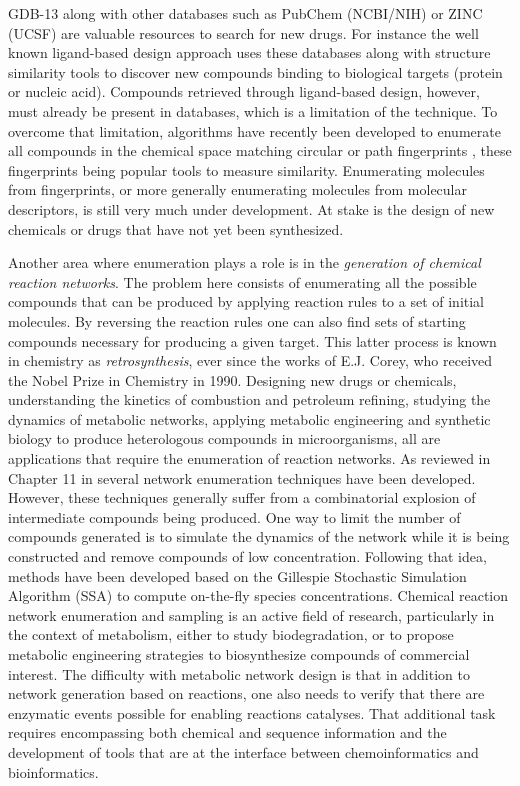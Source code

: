 \documentclass{sig-alternate}
\begin{document}
GDB-13 along with other databases such as PubChem (NCBI/NIH) or ZINC
(UCSF) are valuable resources to search for new drugs. For instance
the well known ligand-based design approach uses these databases along
with structure similarity tools to discover new compounds binding to
biological targets (protein or nucleic acid). Compounds retrieved
through ligand-based design, however, must already be present in
databases, which is a limitation of the technique. To overcome that
limitation, algorithms have recently been developed to enumerate all
compounds in the chemical space matching circular \cite{faulon2003} or
path fingerprints \cite{fujiwara2008}, these fingerprints being
popular tools to measure similarity. Enumerating molecules from
fingerprints, or more generally enumerating molecules from molecular
descriptors, is still very much under development. At stake is the
design of new chemicals or drugs that have not yet been synthesized.

Another area where enumeration plays a role is in the \emph{generation
  of chemical reaction networks}. The problem here consists of
enumerating all the possible compounds that can be produced by
applying reaction rules to a set of initial molecules. By reversing
the reaction rules one can also find sets of starting compounds
necessary for producing a given target. This latter process is known
in chemistry as \emph{retrosynthesis}, ever since the works of
E.J. Corey, who received the Nobel Prize in Chemistry in
1990. Designing new drugs or chemicals, understanding the kinetics of
combustion and petroleum refining, studying the dynamics of metabolic
networks, applying metabolic engineering and synthetic biology to
produce heterologous compounds in microorganisms, all are applications
that require the enumeration of reaction networks. As reviewed in
Chapter 11 in \cite{faulon2010} several network enumeration techniques
have been developed. However, these techniques generally suffer from a
combinatorial explosion of intermediate compounds being produced. One
way to limit the number of compounds generated is to simulate the
dynamics of the network while it is being constructed and remove
compounds of low concentration. Following that idea, methods have been
developed based on the Gillespie Stochastic Simulation Algorithm (SSA)
to compute on-the-fly species concentrations. Chemical reaction
network enumeration and sampling is an active field of research,
particularly in the context of metabolism, either to study
biodegradation, or to propose metabolic engineering strategies to
biosynthesize compounds of commercial interest. The difficulty with
metabolic network design is that in addition to network generation
based on reactions, one also needs to verify that there are enzymatic
events possible for enabling reactions catalyses. That additional task
requires encompassing both chemical and sequence information and the
development of tools that are at the interface between
chemoinformatics and bioinformatics.
\end{document}
